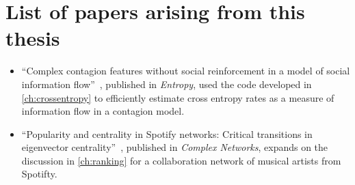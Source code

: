 \chapter{List of papers arising from this thesis}

\begin{itemize}
    \item ``Complex contagion features without social reinforcement in a model of social information flow''~\cite{pondComplexContagionFeatures2020}, published in \emph{Entropy}, used the code developed in \autoref{ch:crossentropy} to efficiently estimate cross entropy rates as a measure of information flow in a contagion model.
    \item ``Popularity and centrality in Spotify networks: Critical transitions in eigenvector centrality''~\cite{south_centrality_2021},  published in \emph{Complex Networks}, expands on the discussion in \autoref{ch:ranking} for a collaboration network of musical artists from Spotifty. 
\end{itemize}